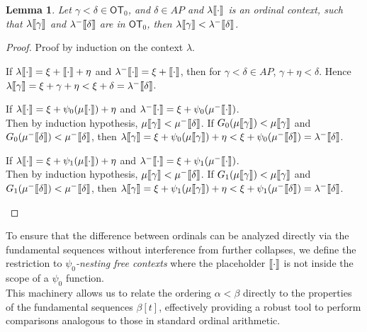 \documentclass{amsart}
\theoremstyle{plain}
\theoremstyle{plain}
\newtheorem{lemma}[theorem]{Lemma}
\def\scbrl{[\hspace{-.14em}[}
\def\scbrr{]\hspace{-.14em}]}
\def\scbr#1{\scbrl#1\scbrr}
\newcommand\OT{\mathsf{OT}}
\newcommand{\ga}{\gamma}
\newcommand{\de}{\delta}
\newcommand{\la}{\lambda}
\def\scbrl{[\hspace{-.14em}[}
\def\scbrr{]\hspace{-.14em}]}
\def\scbr#1{\scbrl#1\scbrr}
\begin{document}
\smallskip

\begin{lemma}
Let $\ga <\de\in \OT_0$, and $\de\in AP$ and $\la\scbr{\cdot}$ is an ordinal context, such that $\la\scbr{\ga}$  and $\la^-\scbr{\de}$ are in $\OT_0$, then $\la\scbr{\ga} < \la^-\scbr{\de}$.\medskip
\end{lemma}
\begin{proof}
Proof by induction on the context $\la$.
\begin{Cases}
    \item If $\la\scbr{\cdot}=\xi+  \scbr{\cdot}+\eta$ and $\la^-\scbr{\cdot}=\xi +\scbr{\cdot}$, 
    then for $\ga<\de \in AP$, $\ga+\eta<\de$.
    Hence $\la\scbr{\ga} =\xi + \ga + \eta < \xi + \de  =  \la^-\scbr{\de} $.\medskip
    
    \item  If $\la\scbr{\cdot}=\xi +  \psi_0(\mu\scbr{\cdot})+\eta$ and $\la^-\scbr{\cdot}=\xi+\psi_0(\mu^-\scbr{\cdot})$.\\
    Then by induction hypothesis, $\mu\scbr{\ga} <\mu^-\scbr{\de}$. If $G_0(\mu\scbr{\ga})< \mu\scbr{\ga}$ and $G_0(\mu^-\scbr{\de}) < \mu^-\scbr{\de}$, then
    $\la\scbr{\ga} =\xi+  \psi_0(\mu\scbr{\ga})+\eta < \xi+\psi_0(\mu^-\scbr{\de}) =\la^-\scbr{\de} $.\medskip
    
    \item  If $\la\scbr{\cdot}=\xi + \psi_1(\mu\scbr{\cdot})+\eta$ and $\la^-\scbr{\cdot}=\xi+\psi_1(\mu^-\scbr{\cdot})$.\\
    Then by induction hypothesis, $\mu\scbr{\ga} <\mu^-\scbr{\de}$.
    If $G_1(\mu\scbr{\ga})< \mu\scbr{\ga}$ and $G_1(\mu^-\scbr{\de}) < \mu^-\scbr{\de}$, then
    $\la\scbr{\ga} =\xi+  \psi_1(\mu\scbr{\ga})+\eta < \xi+\psi_1(\mu^-\scbr{\de}) =\la^-\scbr{\de} $.
\end{Cases}
\end{proof}

\smallskip

To ensure that the difference between ordinals can be analyzed directly via the fundamental sequences without interference from further collapses, we define the restriction to \emph{$\psi_0$-nesting free contexts} where the placeholder $\scbr{\cdot}$ is not inside the scope of a $\psi_0$ function. 
\\
This machinery allows us to relate the ordering $\alpha < \beta$ directly to the properties of the fundamental sequences $\beta[t]$, effectively providing a robust tool to perform comparisons analogous to those in standard ordinal arithmetic. \smallskip
\end{document}
